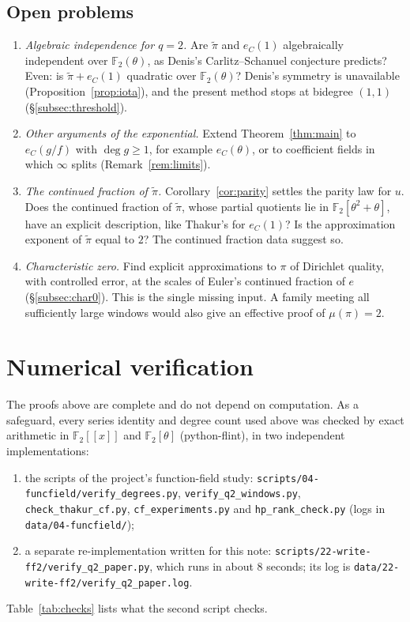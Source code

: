 \documentclass[11pt]{amsart}
\theoremstyle{remark}
\numberwithin{equation}{section}
\newcommand{\F}{\mathbb{F}}
\newcommand{\pit}{\tilde\pi}
\newcommand{\eC}{e_C}
\begin{document}
\subsection{Open problems}
\begin{enumerate}
\item[(1)] \emph{Algebraic independence for $q=2$.} Are $\pit$ and $\eC(1)$ algebraically independent over $\F_2(\theta)$, as Denis's Carlitz--Schanuel conjecture \cite[Conj.~2]{Pel17} predicts? Even: is $\pit+\eC(1)$ quadratic over $\F_2(\theta)$? Denis's symmetry is unavailable (Proposition~\ref{prop:iota}), and the present method stops at bidegree $(1,1)$ (\S\ref{subsec:threshold}).
\item[(2)] \emph{Other arguments of the exponential.} Extend Theorem~\ref{thm:main} to $\eC(g/f)$ with $\deg g\ge1$, for example $\eC(\theta)$, or to coefficient fields in which $\infty$ splits (Remark~\ref{rem:limits}).
\item[(3)] \emph{The continued fraction of $\pit$.} Corollary~\ref{cor:parity} settles the parity law for $u$. Does the continued fraction of $\pit$, whose partial quotients lie in $\F_2[\theta^2+\theta]$, have an explicit description, like Thakur's for $\eC(1)$? Is the approximation exponent of $\pit$ equal to $2$? The continued fraction data suggest so.
\item[(4)] \emph{Characteristic zero.} Find explicit approximations to $\pi$ of Dirichlet quality, with controlled error, at the scales of Euler's continued fraction of $e$ (\S\ref{subsec:char0}). This is the single missing input. A family meeting all sufficiently large windows would also give an effective proof of $\mu(\pi)=2$.
\end{enumerate}

\section{Numerical verification}\label{sec:numerics}

The proofs above are complete and do not depend on computation. As a safeguard, every series identity and degree count used above was checked by exact arithmetic in $\F_2[[x]]$ and $\F_2[\theta]$ (python-flint), in two independent implementations:
\begin{enumerate}
\item[(1)] the scripts of the project's function-field study: \texttt{scripts/04-funcfield/verify\_degrees.py}, \texttt{verify\_q2\_windows.py}, \texttt{check\_thakur\_cf.py}, \texttt{cf\_experiments.py} and \texttt{hp\_rank\_check.py} (logs in \texttt{data/04-funcfield/});
\item[(2)] a separate re-implementation written for this note: \texttt{scripts/22-write-ff2/verify\_q2\_paper.py}, which runs in about 8 seconds; its log is \texttt{data/22-write-ff2/verify\_q2\_paper.log}.
\end{enumerate}
Table~\ref{tab:checks} lists what the second script checks.
\end{document}
